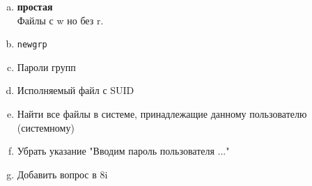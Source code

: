 \documentclass{article}
\begin{document}
\begin{enumerate}[a.]
\item \textbf{простая}\\
Файлы с w но без r.


\item \texttt{newgrp}\\

\item Пароли групп\\

\item Исполняемый файл с SUID\\


\item Найти все файлы в системе, принадлежащие данному пользователю (системному)\\

\item Убрать указание "Вводим пароль пользователя ..."\\

\item Добавить вопрос в 8i\\


\end{enumerate}
\fi
\end{document}
